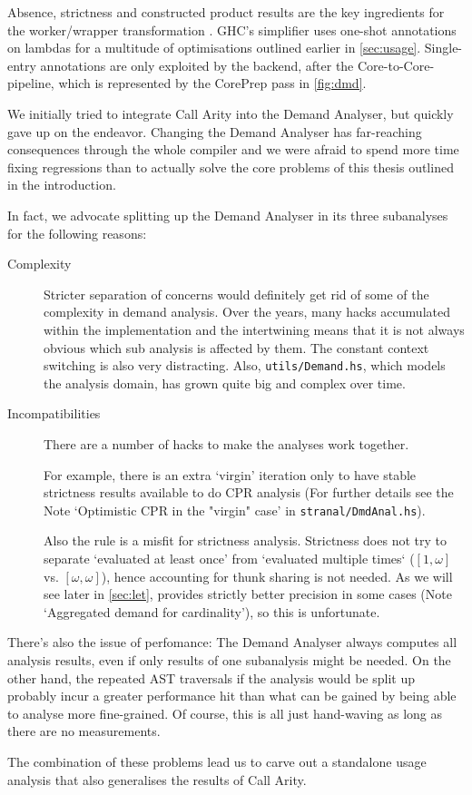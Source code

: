 Absence, strictness and constructed product results are the key ingredients for the worker/wrapper transformation \parencite{ww}.
GHC's simplifier uses one-shot annotations on lambdas for a multitude of optimisations outlined earlier in \cref{sec:usage}.
Single-entry annotations are only exploited by the backend, after the Core-to-Core-pipeline, which is represented by the CorePrep pass in \cref{fig:dmd}.\medskip

We initially tried to integrate Call Arity into the Demand Analyser, but quickly gave up on the endeavor.
Changing the Demand Analyser has far-reaching consequences through the whole compiler and we were afraid to spend more time fixing regressions than to actually solve the core problems of this thesis outlined in the introduction.

In fact, we advocate splitting up the Demand Analyser in its three subanalyses for the following reasons:
\begin{description}
  \item[Complexity] 
    Stricter separation of concerns would definitely get rid of some of the complexity in demand analysis.
    Over the years, many hacks accumulated within the implementation and the intertwining means that it is not always obvious which sub analysis is affected by them.
    The constant context switching is also very distracting.
    Also, \texttt{utils/Demand.hs}, which models the analysis domain, has grown quite big and complex over time.
  \item[Incompatibilities]
    There are a number of hacks to make the analyses work together.

    For example, there is an extra `virgin' iteration only to have stable strictness results available to do CPR analysis (For further details see the Note `Optimistic CPR in the "virgin" case' in \texttt{stranal/DmdAnal.hs}).

    Also the  rule is a misfit for strictness analysis.
    Strictness does not try to separate `evaluated at least once' from `evaluated multiple times` (\eg $[1,\omega]$ vs. $[\omega,\omega]$), hence accounting for thunk sharing is not needed.
    As we will see later in \cref{sec:let},  provides strictly better precision in some cases (Note `Aggregated demand for cardinality'), so this is unfortunate.
\end{description}

There's also the issue of perfomance:
The Demand Analyser always computes all analysis results, even if only results of one subanalysis might be needed.
On the other hand, the repeated AST traversals if the analysis would be split up probably incur a greater performance hit than what can be gained by being able to analyse more fine-grained.
Of course, this is all just hand-waving as long as there are no measurements.

The combination of these problems lead us to carve out a standalone usage analysis that also generalises the results of Call Arity.
